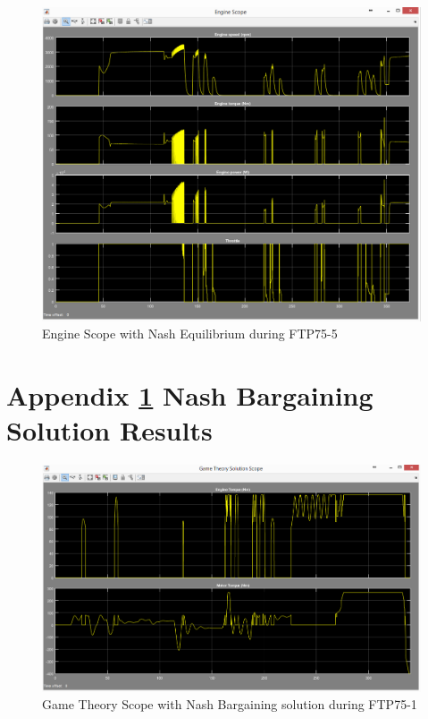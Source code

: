 \begin{figure}[h]
\centering
\includegraphics[scale=0.37]{figures/NashEquilibrium/FTP75-5/engine16Juni}
\caption{Engine Scope with Nash Equilibrium during FTP75-5}
\label{fig:ene5}
\end{figure}

\chapter{Appendix \ref{app:2} Nash Bargaining Solution Results}
\label{app:2}

\begin{figure}[h]
\centering
\includegraphics[scale=0.4]{figures/NashSolution/FTP75-1/gameTheory17Juni}
\caption{Game Theory Scope with Nash Bargaining solution during FTP75-1}
\label{fig:gtns1}
\end{figure}

